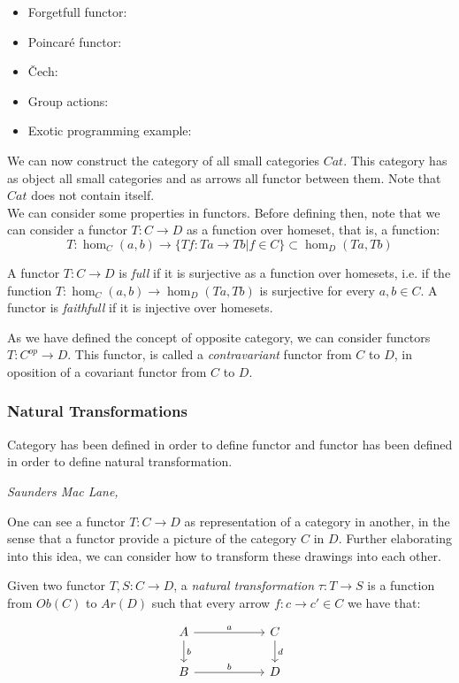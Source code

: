 \begin{example}
  \begin{itemize}
  \item Forgetfull functor:
  \item Poincaré functor:
  \item \v{C}ech:
  \item Group actions:
  \item Exotic programming example:
  \end{itemize}
\end{example}

We can now construct the category of all small categories $Cat$. This category has as object all small categories and as arrows all functor between them. Note that $Cat$ does not contain itself.\\

We can consider some properties in functors. Before defining then, note that we can consider a functor $T:C\to D$ as a function over homeset, that is, a function: 
$$T:\hom_C(a,b) \to \{Tf: Ta \to Tb | f \in C\} \subset \hom_D(Ta,Tb)$$

\begin{definition}
  A functor $T:C\to D$ is \emph{full} if it is surjective as a function over homesets, i.e. if the function $T:\hom_C(a,b) \to  \hom_D(Ta,Tb)$  is surjective for every $a,b \in C$. A functor is \emph{faithfull} if it is injective over homesets.
\end{definition}

As we have defined the concept of opposite category, we can consider functors $T:C^{op} \to D$. This functor, is called a \emph{contravariant} functor from $C$ to $D$, in oposition of a covariant functor from $C$ to $D$.


\subsubsection{Natural Transformations}
\epigraph{Category has been defined in order to define functor and functor has been defined in order to define natural transformation. }{\textit{Saunders Mac Lane,\cite{mac2013categories}}}


One can see a functor $T:C\to D$ as representation of a category in another, in the sense that a functor provide a picture of the category $C$ in $D$. Further elaborating into this idea, we can consider how to transform these drawings into each other. 

\begin{definition}
  Given two functor $T,S:C\to D$, a \emph{natural transformation} $\tau : T \to S$ is a function from $Ob(C)$ to $Ar(D)$ such that every arrow $f:c \to c' \in C$ we have that:
\[
  \begin{tikzpicture}
  \node {\begin{tikzcd}[column sep=20mm]
      A\ar[r,"a"]\ar[d,"b"] & C\ar[d,"d"]\\
      B\ar[r,"b"] & D
  \end{tikzcd}};
\end{tikzpicture}
\]
  \end{definition}

